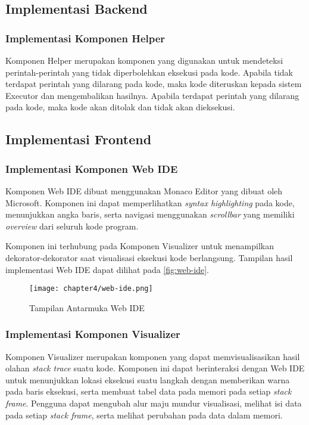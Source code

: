 
\subsection{Implementasi Backend}
\subsubsection{Implementasi Komponen Helper}
Komponen Helper merupakan komponen yang digunakan untuk mendeteksi perintah-perintah yang tidak diperbolehkan eksekusi pada kode. Apabila tidak terdapat perintah yang dilarang pada kode, maka kode diteruskan kepada sistem Executor dan mengembalikan hasilnya. Apabila terdapat perintah yang dilarang pada kode, maka kode akan ditolak dan tidak akan dieksekusi.


\subsection{Implementasi Frontend}

\subsubsection{Implementasi Komponen Web IDE}
Komponen Web IDE dibuat menggunakan Monaco Editor yang dibuat oleh Microsoft. Komponen ini dapat memperlihatkan \textit{syntax highlighting} pada kode, menunjukkan angka baris, serta navigasi menggunakan \textit{scrollbar} yang memiliki \textit{overview} dari seluruh kode program.

Komponen ini terhubung pada Komponen Visualizer untuk menampilkan dekorator-dekorator saat visualisasi eksekusi kode berlangsung. Tampilan hasil implementasi Web IDE dapat dilihat pada \autoref{fig:web-ide}.

\begin{figure}[H]
  \centering
  \texttt{[image: chapter4/web-ide.png]}
  \caption{Tampilan Antarmuka Web IDE} \label{fig:web-ide}
\end{figure}

\subsubsection{Implementasi Komponen Visualizer}
Komponen Visualizer merupakan komponen yang dapat memvisualisasikan hasil olahan \textit{stack trace} suatu kode. Komponen ini dapat berinteraksi dengan Web IDE untuk menunjukkan lokasi eksekusi suatu langkah dengan memberikan warna pada baris eksekusi, serta membuat tabel data pada memori pada setiap \textit{stack frame}. Pengguna dapat mengubah alur maju mundur visualisasi, melihat isi data pada setiap \textit{stack frame}, serta melihat perubahan pada data dalam memori.

